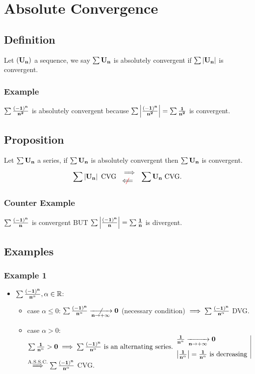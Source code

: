 \documentclass[notitlepage]{math}
\begin{document}
\section{Absolute Convergence}
\subsection{Definition}
Let $\bf (U_n)$ a sequence, we say $\bf \sum U_n$ is absolutely convergent if $\bf \sum \left\lvert U_n \right\rvert$ is convergent.
\subsubsection{Example}
$\bf \sum \frac{(-1)^n}{n^2}$ is absolutely convergent because $\bf \sum \left\lvert \frac{(-1)^n}{n^2} \right\rvert = \sum \frac{1}{n^2}$ is convergent.
\subsection{Proposition}
Let $\bf \sum U_n$ a series, if $\bf \sum U_n$ is absolutely convergent then $\bf \sum U_n$ is convergent.
\[\bf \sum \left\lvert U_n \right\rvert \text{ CVG } \begin{array}{l}  \implies \\ {\color{red}\centernot{\color{black}\Longleftarrow}} \end{array} \bf \sum U_n \text{ CVG.}\]
\subsubsection{Counter Example}
$\bf \sum \frac{(-1)^n}{n}$ is convergent BUT $\bf \sum \left\lvert \frac{(-1)^n}{n} \right\rvert = \sum \frac{1}{n}$ is divergent.
\subsection{Examples}
\subsubsection{Example 1}
\begin{itemize}
    \item $\bf \sum \frac{(-1)^n}{n^\alpha}, \alpha \in \mathbb{R}$: 
    \begin{itemize}
        \item case $\alpha \leq 0$: $\bf \sum \frac{(-1)^n}{n^\alpha} \centernot{\xrightarrow[n \to +\infty]{}} 0$ (necessary condition) $\implies \bf \sum \frac{(-1)^n}{n^\alpha}$ DVG.
        \item case $\alpha > 0$: $
             \bf \sum \frac{1}{n^\alpha} > 0 \implies \bf \sum \frac{(-1)^n}{n^\alpha} \text{ is an alternating series}.\\[1em]
            \begin{array}{l|c}
             \bf \frac{1}{n^\alpha} \xrightarrow[n \to +\infty]{} 0\\[1em]
             \bf \left\lvert \frac{1}{n^\alpha} \right\rvert = \frac{1}{n^\alpha} \text{ is decreasing}&
        \end{array}$ $\overset{\text{A.S.S.C.}}{\implies} \bf \sum \frac{(-1)^n}{n^\alpha}$ CVG.
    \end{itemize}
\end{itemize}
\end{document}

